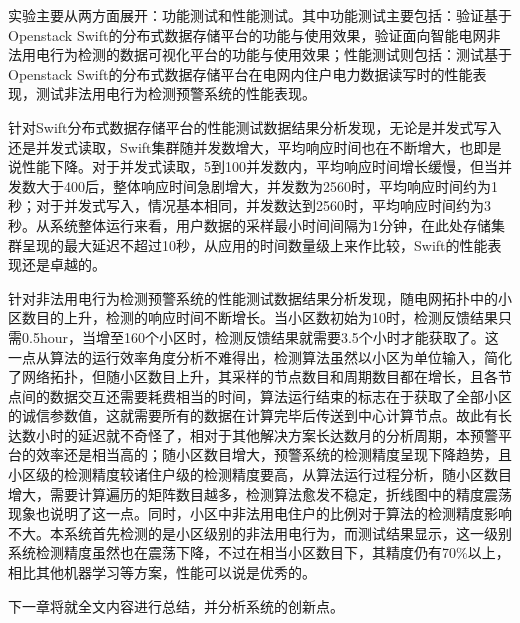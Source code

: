 实验主要从两方面展开：功能测试和性能测试。其中功能测试主要包括：验证基于Openstack Swift的分布式数据存储平台的功能与使用效果，验证面向智能电网非法用电行为检测的数据可视化平台的功能与使用效果；性能测试则包括：测试基于Openstack Swift的分布式数据存储平台在电网内住户电力数据读写时的性能表现，测试非法用电行为检测预警系统的性能表现。

针对Swift分布式数据存储平台的性能测试数据结果分析发现，无论是并发式写入还是并发式读取，Swift集群随并发数增大，平均响应时间也在不断增大，也即是说性能下降。对于并发式读取，5到100并发数内，平均响应时间增长缓慢，但当并发数大于400后，整体响应时间急剧增大，并发数为2560时，平均响应时间约为1秒；对于并发式写入，情况基本相同，并发数达到2560时，平均响应时间约为3秒。从系统整体运行来看，用户数据的采样最小时间间隔为1分钟，在此处存储集群呈现的最大延迟不超过10秒，从应用的时间数量级上来作比较，Swift的性能表现还是卓越的。

针对非法用电行为检测预警系统的性能测试数据结果分析发现，随电网拓扑中的小区数目的上升，检测的响应时间不断增长。当小区数初始为10时，检测反馈结果只需0.5hour，当增至160个小区时，检测反馈结果就需要3.5个小时才能获取了。这一点从算法的运行效率角度分析不难得出，检测算法虽然以小区为单位输入，简化了网络拓扑，但随小区数目上升，其采样的节点数目和周期数目都在增长，且各节点间的数据交互还需要耗费相当的时间，算法运行结束的标志在于获取了全部小区的诚信参数值，这就需要所有的数据在计算完毕后传送到中心计算节点。故此有长达数小时的延迟就不奇怪了，相对于其他解决方案长达数月的分析周期，本预警平台的效率还是相当高的；随小区数目增大，预警系统的检测精度呈现下降趋势，且小区级的检测精度较诸住户级的检测精度要高，从算法运行过程分析，随小区数目增大，需要计算遍历的矩阵数目越多，检测算法愈发不稳定，折线图中的精度震荡现象也说明了这一点。同时，小区中非法用电住户的比例对于算法的检测精度影响不大。本系统首先检测的是小区级别的非法用电行为，而测试结果显示，这一级别系统检测精度虽然也在震荡下降，不过在相当小区数目下，其精度仍有70\%以上，相比其他机器学习等方案，性能可以说是优秀的。

下一章将就全文内容进行总结，并分析系统的创新点。